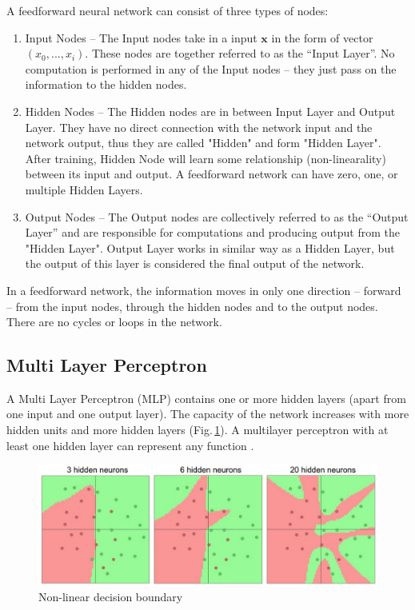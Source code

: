 A feedforward neural network can consist of three types of nodes:

\begin{enumerate}
\item Input Nodes – The Input nodes take in a input $\mathbf{x}$ in the form of vector $(x_0,...,x_i)$. These nodes are together referred to as the “Input Layer”. No computation is performed in any of the Input nodes – they just pass on the information to the hidden nodes.

\item Hidden Nodes – The Hidden nodes are in between Input Layer and Output Layer. They have no direct connection with the network input and the network output, thus they are called "Hidden" and form "Hidden Layer". After training, Hidden Node will learn some relationship (non-linearality) between its input and output. A feedforward network can have zero, one, or multiple Hidden Layers.

\item Output Nodes – The Output nodes are collectively referred to as the “Output Layer” and are responsible for computations and producing output from the "Hidden Layer". Output Layer works in similar way as a Hidden Layer, but the output of this layer is considered the final output of the network.

\end{enumerate}

In a feedforward network, the information moves in only one direction – forward – from the input nodes, through the hidden nodes and to the output nodes. There are no cycles or loops in the network.


\subsection{Multi Layer Perceptron}
A Multi Layer Perceptron (MLP) contains one or more hidden layers (apart from one input and one output layer). The capacity of the network increases with more hidden units and more hidden layers (Fig.\,\ref{anyfunction}). A multilayer perceptron with at least one hidden layer can represent any function \citep{Cybenko1989}.

\begin{figure}[h]
	\centering
	\includegraphics[scale=0.5]{Figs/anyfunction.png}
    \caption{Non-linear decision boundary}
    \label{anyfunction}
\end{figure}


